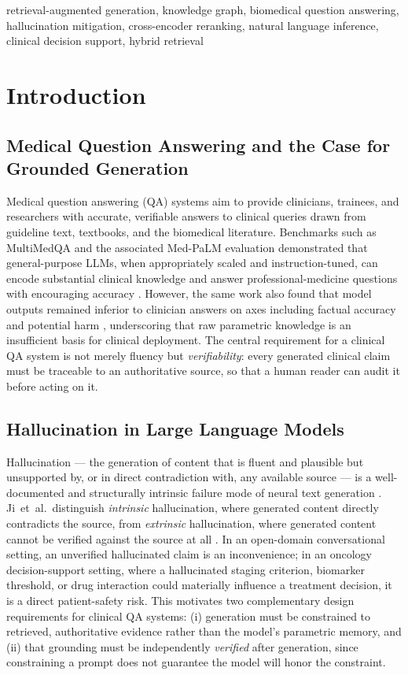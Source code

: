 \documentclass[conference]{IEEEtran}
\begin{document}
\begin{IEEEkeywords}
retrieval-augmented generation, knowledge graph, biomedical question answering, hallucination mitigation, cross-encoder reranking, natural language inference, clinical decision support, hybrid retrieval
\end{IEEEkeywords}

\section{Introduction}

\subsection{Medical Question Answering and the Case for Grounded Generation}
Medical question answering (QA) systems aim to provide clinicians, trainees, and researchers with accurate, verifiable answers to clinical queries drawn from guideline text, textbooks, and the biomedical literature. Benchmarks such as MultiMedQA and the associated Med-PaLM evaluation demonstrated that general-purpose LLMs, when appropriately scaled and instruction-tuned, can encode substantial clinical knowledge and answer professional-medicine questions with encouraging accuracy \cite{singhal2023large}. However, the same work also found that model outputs remained inferior to clinician answers on axes including factual accuracy and potential harm \cite{singhal2023large}, underscoring that raw parametric knowledge is an insufficient basis for clinical deployment. The central requirement for a clinical QA system is not merely fluency but \emph{verifiability}: every generated clinical claim must be traceable to an authoritative source, so that a human reader can audit it before acting on it.

\subsection{Hallucination in Large Language Models}
Hallucination --- the generation of content that is fluent and plausible but unsupported by, or in direct contradiction with, any available source --- is a well-documented and structurally intrinsic failure mode of neural text generation \cite{ji2023survey}. Ji~et~al.\ distinguish \emph{intrinsic} hallucination, where generated content directly contradicts the source, from \emph{extrinsic} hallucination, where generated content cannot be verified against the source at all \cite{ji2023survey}. In an open-domain conversational setting, an unverified hallucinated claim is an inconvenience; in an oncology decision-support setting, where a hallucinated staging criterion, biomarker threshold, or drug interaction could materially influence a treatment decision, it is a direct patient-safety risk. This motivates two complementary design requirements for clinical QA systems: (i) generation must be constrained to retrieved, authoritative evidence rather than the model's parametric memory, and (ii) that grounding must be independently \emph{verified} after generation, since constraining a prompt does not guarantee the model will honor the constraint.
\end{document}
